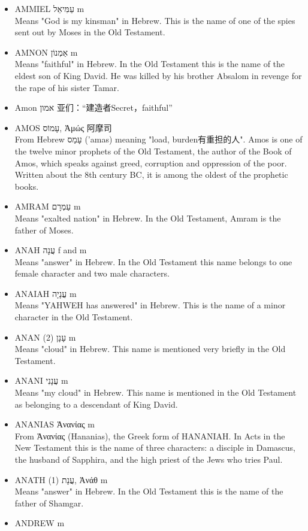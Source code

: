 \begin{itemize}
\item {AMMIEL עַמִּיאֵל m}\\
Means "God is my kinsman" in Hebrew. This is the name of one of the spies sent out by Moses in the Old Testament.
\item {AMNON אַמְנוֹן m}\\
Means "faithful" in Hebrew. In the Old Testament this is the name of the eldest son of King David. He was killed by his brother Absalom in revenge for the rape of his sister Tamar.
\item Amon אמון 亚们：“建造者Secret，faithful”
\item {AMOS עָמוֹס, Ἀμώς  阿摩司}\\
From Hebrew עָמַס ('amas) meaning "load, burden有重担的人". Amos is one of the twelve minor prophets of the Old Testament, the author of the Book of Amos, which speaks against greed, corruption and oppression of the poor. Written about the 8th century BC, it is among the oldest of the prophetic books. 
\item {AMRAM עַמְרָם m}\\
Means "exalted nation" in Hebrew. In the Old Testament, Amram is the father of Moses.
\item {ANAH עֲנָה f and m}\\
Means "answer" in Hebrew. In the Old Testament this name belongs to one female character and two male characters.
\item {ANAIAH עֲנָיָה m}\\
Means "YAHWEH has answered" in Hebrew. This is the name of a minor character in the Old Testament.
\item {ANAN (2) עָנָן m}\\
Means "cloud" in Hebrew. This name is mentioned very briefly in the Old Testament.
\item {ANANI עֲנָנִי m}\\
Means "my cloud" in Hebrew. This name is mentioned in the Old Testament as belonging to a descendant of King David.
\item {ANANIAS Ἁνανίας m}\\
From Ἁνανίας (Hananias), the Greek form of HANANIAH. In Acts in the New Testament this is the name of three characters: a disciple in Damascus, the husband of Sapphira, and the high priest of the Jews who tries Paul.
\item {ANATH (1) עֲנָת, Ἀνάθ m}\\
Means "answer" in Hebrew. In the Old Testament this is the name of the father of Shamgar.
\item {ANDREW m}\\

\end{itemize}
